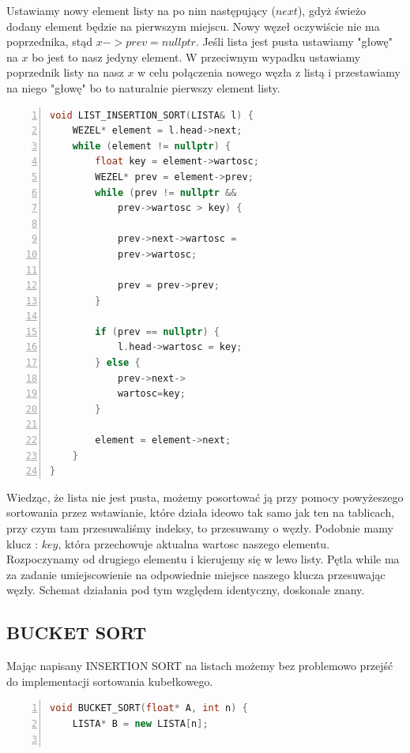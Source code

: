 \documentclass{article}
\begin{document}
\large{Ustawiamy nowy element listy na po nim następujący ($next$), gdyż świeżo dodany element będzie na pierwszym miejscu. Nowy węzeł oczywiście nie ma poprzednika, stąd $x->prev = nullptr$. Jeśli lista jest pusta ustawiamy "głowę" na $x$ bo jest to nasz jedyny element. W przeciwnym wypadku ustawiamy poprzednik listy na nasz $x$ w celu połączenia nowego węzła z listą i przestawiamy na niego "głowę" bo to naturalnie pierwszy element listy.
	
\begin{lstlisting}[language=C++, caption={Kod funkcji sortowania przez wstawianie na listach}, numbers=left, frame=single, xleftmargin=20pt]
void LIST_INSERTION_SORT(LISTA& l) {
	WEZEL* element = l.head->next;
	while (element != nullptr) {
		float key = element->wartosc;
		WEZEL* prev = element->prev;
		while (prev != nullptr &&
			prev->wartosc > key) {
			
			prev->next->wartosc =
			prev->wartosc;
			
			prev = prev->prev;
		}
		
		if (prev == nullptr) {
			l.head->wartosc = key;
		} else {
			prev->next->
			wartosc=key;
		}
		
		element = element->next;
	}
}
\end{lstlisting}

\large{Wiedząc, że lista nie jest pusta, możemy posortować ją przy pomocy powyżeszego sortowania przez wstawianie, które działa ideowo tak samo jak ten na tablicach, przy czym tam przesuwaliśmy indeksy, to przesuwamy o węzły. Podobnie mamy klucz : $key$, która przechowuje aktualna wartosc naszego elementu. Rozpoczynamy od drugiego elementu i kierujemy się w lewo listy. Pętla while ma za zadanie umiejscowienie na odpowiednie miejsce naszego klucza przesuwając węzły. Schemat działania pod tym względem identyczny, doskonale znany.}

\subsection{BUCKET SORT}

\large{Mając napisany INSERTION SORT na listach możemy bez problemowo przejść do implementacji sortowania kubełkowego.}

\begin{lstlisting}[language=C++, caption={Kod funkcji sortowania kubełkowego}, numbers=left, frame=single, xleftmargin=5pt, xrightmargin=5pt]
void BUCKET_SORT(float* A, int n) {
	LISTA* B = new LISTA[n];
	

\end{lstlisting}}
\end{document}
